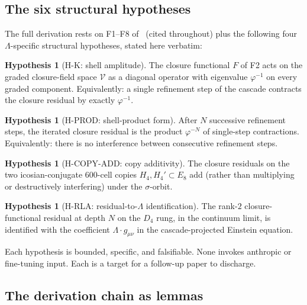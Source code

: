 \documentclass[11pt]{article}
\theoremstyle{plain}
\theoremstyle{definition}
\newtheorem{hypothesis}[theorem]{Hypothesis}
\theoremstyle{remark}
\newcommand{\Vcal}{\mathcal{V}}
\begin{document}
\subsection{The six structural hypotheses}\label{sec:lambda-hypotheses}

The full derivation rests on F1--F8 of~\citet{SmartXXXVI} (cited throughout) plus the following four $\Lambda$-specific structural hypotheses, stated here verbatim:

\begin{hypothesis}[H-K: shell amplitude]\label{hyp:HK}
The closure functional $F$ of F2 acts on the graded closure-field space $\Vcal$ as a diagonal operator with eigenvalue $\varphi^{-1}$ on every graded component. Equivalently: a single refinement step of the cascade contracts the closure residual by exactly $\varphi^{-1}$.
\end{hypothesis}

\begin{hypothesis}[H-PROD: shell-product form]\label{hyp:HPROD}
After $N$ successive refinement steps, the iterated closure residual is the product $\varphi^{-N}$ of single-step contractions. Equivalently: there is no interference between consecutive refinement steps.
\end{hypothesis}

\begin{hypothesis}[H-COPY-ADD: copy additivity]\label{hyp:HCOPYADD}
The closure residuals on the two icosian-conjugate 600-cell copies $H_4, H_4' \subset E_8$ add (rather than multiplying or destructively interfering) under the $\sigma$-orbit.
\end{hypothesis}

\begin{hypothesis}[H-RLA: residual-to-$\Lambda$ identification]\label{hyp:HRLA}
The rank-$2$ closure-functional residual at depth $N$ on the $D_4$ rung, in the continuum limit, is identified with the coefficient $\Lambda \cdot g_{\mu\nu}$ in the cascade-projected Einstein equation.
\end{hypothesis}

Each hypothesis is bounded, specific, and falsifiable. None invokes anthropic or fine-tuning input. Each is a target for a follow-up paper to discharge.

\subsection{The derivation chain as lemmas}\label{sec:lambda-chain}
\end{document}
